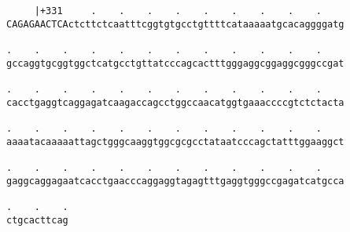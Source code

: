 \documentclass{article}
\begin{document}
\begin{Verbatim}
     |+331     .    .    .    .    .    .    .    .    .    
CAGAGAACTCActcttctcaatttcggtgtgcctgttttcataaaaatgcacaggggatg
                                                            
.    .    .    .    .    .    .    .    .    .    .    .    
gccaggtgcggtggctcatgcctgttatcccagcactttgggaggcggaggcgggccgat
                                                            
.    .    .    .    .    .    .    .    .    .    .    .    
cacctgaggtcaggagatcaagaccagcctggccaacatggtgaaaccccgtctctacta
                                                            
.    .    .    .    .    .    .    .    .    .    .    .    
aaaatacaaaaattagctgggcaaggtggcgcgcctataatcccagctatttggaaggct
                                                            
.    .    .    .    .    .    .    .    .    .    .    .    
gaggcaggagaatcacctgaacccaggaggtagagtttgaggtgggccgagatcatgcca
                                                            
.    .    .
ctgcacttcag
           
           
\end{Verbatim}
\end{document}
